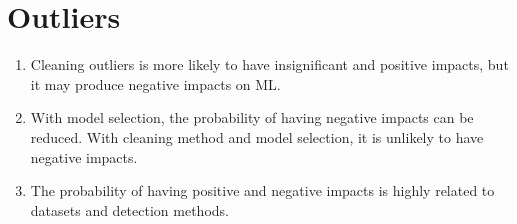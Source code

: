 \section{Outliers} \label{sec:outliers}

\begin{enumerate}
	\item {
		Cleaning outliers is more likely to have insignificant
		and positive impacts, but it may produce negative impacts on ML.
	}
	\item {
		With model selection, the probability of having
		negative impacts can be reduced. With cleaning method and
		model selection, it is unlikely to have negative impacts.
	}
	\item {
		The probability of having positive and negative
		impacts is highly related to datasets and detection methods.
	}
\end{enumerate}

